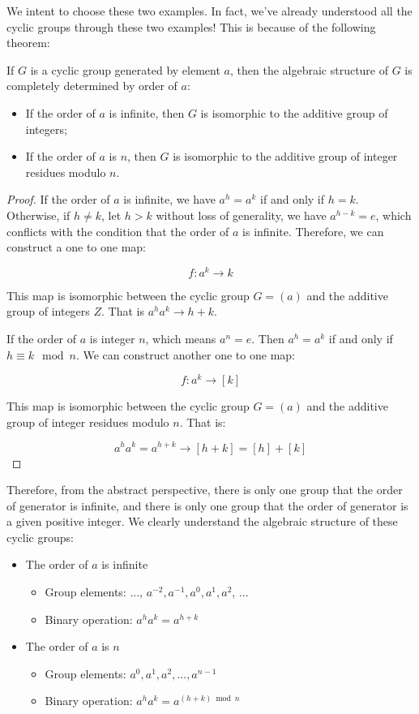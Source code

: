 \documentclass[b5paper]{article}
\begin{document}
We intent to choose these two examples. In fact, we've already understood all the cyclic groups through these two examples! This is because of the following theorem:

\begin{theorem}
If $G$ is a cyclic group generated by element $a$, then the algebraic structure of $G$ is completely determined by order of $a$:
\begin{itemize}
\item If the order of $a$ is infinite, then $G$ is isomorphic to the additive group of integers;
\item If the order of $a$ is $n$, then $G$ is isomorphic to the additive group of integer residues modulo $n$.
\end{itemize}
\end{theorem}

\begin{proof}
If the order of $a$ is infinite, we have $a^h = a^k$ if and only if $h = k$. Otherwise, if $h \neq k$, let $h > k$ without loss of generality, we have $a^{h - k} = e$, which conflicts with the condition that the order of $a$ is infinite. Therefore, we can construct a one to one map:

\[
f: a^k \to k
\]

This map is isomorphic between the cyclic group $G = (a)$ and the additive group of integers $Z$. That is $a^ha^k \to h + k$.

If the order of $a$ is integer $n$, which means $a^n = e$. Then $a^h = a^k$ if and only if $h \equiv k \mod n$. We can construct another one to one map:

\[
f: a^k \to [k]
\]

This map is isomorphic between the cyclic group $G = (a)$ and the additive group of integer residues modulo $n$. That is:

\[
a^ha^k = a^{h + k} \to [h + k] = [h] + [k]
\]
\end{proof}

Therefore, from the abstract perspective, there is only one group that the order of generator is infinite, and there is only one group that the order of generator is a given positive integer. We clearly understand the algebraic structure of these cyclic groups:

\begin{itemize}
\item The order of $a$ is infinite
  \begin{itemize}
  \item Group elements: ..., $a^{-2}, a^{-1}, a^0, a^1, a^2$, ...
  \item Binary operation: $a^ha^k = a^{h + k}$
  \end{itemize}
\item The order of $a$ is $n$
  \begin{itemize}
  \item Group elements: $a^0, a^1, a^2, ..., a^{n-1}$
  \item Binary operation: $a^ha^k = a^{(h + k) \bmod n}$
  \end{itemize}
\end{itemize}
\end{document}
